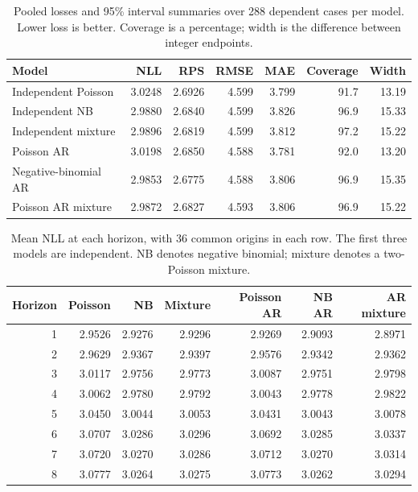 \begin{table}[htbp]
\centering\small
\caption{Pooled losses and 95\% interval summaries over 288 dependent cases per model. Lower loss is better. Coverage is a percentage; width is the difference between integer endpoints.}
\label{tab:pooled}
\begin{tabular}{lrrrrrr}
\toprule
Model & NLL & RPS & RMSE & MAE & Coverage & Width \\
\midrule
Independent Poisson & 3.0248 & 2.6926 & 4.599 & 3.799 & 91.7 & 13.19 \\
Independent NB & 2.9880 & 2.6840 & 4.599 & 3.826 & 96.9 & 15.33 \\
Independent mixture & 2.9896 & 2.6819 & 4.599 & 3.812 & 97.2 & 15.22 \\
Poisson AR & 3.0198 & 2.6850 & 4.588 & 3.781 & 92.0 & 13.20 \\
Negative-binomial AR & 2.9853 & 2.6775 & 4.588 & 3.806 & 96.9 & 15.35 \\
Poisson AR mixture & 2.9872 & 2.6827 & 4.593 & 3.806 & 96.9 & 15.22 \\
\bottomrule
\end{tabular}
\end{table}
\begin{table}[htbp]
\centering\small
\caption{Mean NLL at each horizon, with 36 common origins in each row. The first three models are independent. NB denotes negative binomial; mixture denotes a two-Poisson mixture.}
\label{tab:horizons}
\begin{tabular}{rrrrrrr}
\toprule
Horizon & Poisson & NB & Mixture & Poisson AR & NB AR & AR mixture \\
\midrule
1 & 2.9526 & 2.9276 & 2.9296 & 2.9269 & 2.9093 & 2.8971 \\
2 & 2.9629 & 2.9367 & 2.9397 & 2.9576 & 2.9342 & 2.9362 \\
3 & 3.0117 & 2.9756 & 2.9773 & 3.0087 & 2.9751 & 2.9798 \\
4 & 3.0062 & 2.9780 & 2.9792 & 3.0043 & 2.9778 & 2.9822 \\
5 & 3.0450 & 3.0044 & 3.0053 & 3.0431 & 3.0043 & 3.0078 \\
6 & 3.0707 & 3.0286 & 3.0296 & 3.0692 & 3.0285 & 3.0337 \\
7 & 3.0720 & 3.0270 & 3.0286 & 3.0712 & 3.0270 & 3.0314 \\
8 & 3.0777 & 3.0264 & 3.0275 & 3.0773 & 3.0262 & 3.0294 \\
\bottomrule
\end{tabular}
\end{table}
